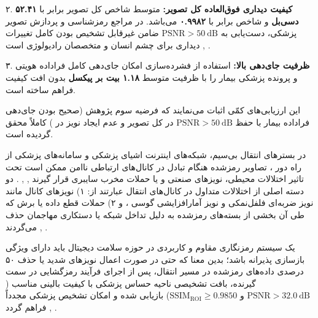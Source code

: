 ۲. \textbf{کیفیت دیداری فوق‌العاده کل تصویر:} متوسط شاخص  کل تصویر برابر با \textbf{۵۲.۴۱ دسی‌بل} و شاخص  برابر با \textbf{۰.۹۹۸۲} می‌باشد. در مراجع رمزشناسی و پردازش تصویر پزشکی، دست‌یابی به $\mathrm{PSNR} > 50\mathrm{\ dB}$ ضامن غیرقابل تشخیص بودن کامل تغییرات دیداری برای چشم انسان و متخصصان رادیولوژی است , .\par

۳. \textbf{ظرفیت جای‌دهی بالا:} استفاده از فشرده‌سازی  امکان جای‌دهی کامل فراداده هویتی و پرونده پزشکی بیمار را با ظرفیت متوسط \textbf{۱.۱۸ بیت بر پیکسل} بدون افت کیفیت فراهم ساخته است.\par



این ارزیابی‌های کمّی اثبات می‌نمایند که فرضیه سوم پژوهش (صحیح بودن جای‌دهی فراداده بیمار با حفظ $\mathrm{PSNR} > 50\mathrm{\ dB}$ در کل تصویر و عدم ایجاد نویز در ) کاملاً محقق گردیده است.\par



در بسترهای انتقال بی‌سیم، شبکه‌های اینترنت اشیای پزشکی  و سامانه‌های پزشکی از راه دور ، تصاویر رمزشده هنگام تبادل در کانال‌های ارتباطی ناامن ممکن است تحت تاثیر اختلالات محیطی، نویزهای صنعتی و یا حملات مخرب سایبری قرار گیرند , , . دو دسته اصلی از اختلالات متداول در کانال‌های انتقال عبارتند از: ۱) نویزهای کانال مانند نویز ضربه‌ای فلفل‌نمکی  و نویز آمارافزایشی گوسی ، و ۲) حملات قطع داده یا برش  که طی آن بخشی از بسته‌های رمزشده به دلیل تداخل شبکه یا دستکاری مهاجمان حذف می‌گردند , .\par



یک سیستم رمزنگاری مقاوم و کاربردی در حوزه سلامت دیجیتال باید دارای ویژگی بازسازی پذیرانه  باشد؛ بدین معنا که حتی در صورت اعمال نویزهای شدید یا حذف ۵۰ درصدی داده‌های رمزشده در مسیر انتقال، پس از اجرای فرآیند رمزگشایی در سمت گیرنده، بافت تشخیصی ناحیه حساس پزشکی  با کیفیت بالینی مناسب ($\mathrm{PSNR} > 32.0\mathrm{\ dB}$ و $\mathrm{SSIM}_{\mathrm{ROI}} \ge 0.9850$) بازیابی شده و امکان تشخیص پزشکی مجدداً فراهم گردد , .\par

